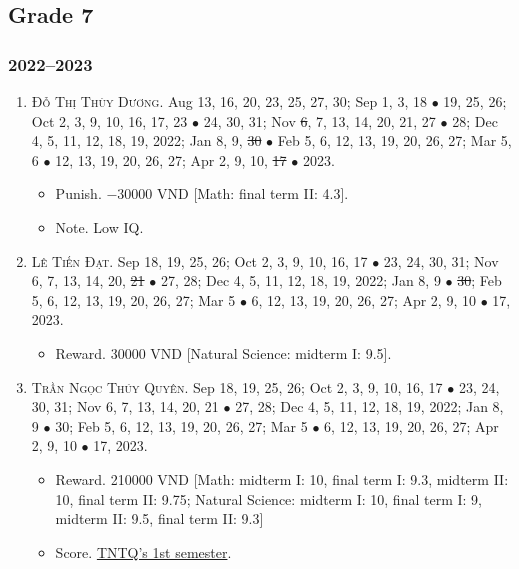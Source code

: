 \documentclass{article}
\begin{document}

\subsection{Grade 7}

\subsubsection{2022--2023}

\begin{enumerate}
	\item \textsc{Đỗ Thị Thùy Dương.} {\sf[In]} Aug 13, 16, 20, 23, 25, 27, 30; Sep 1, 3, 18 $\bullet$ 19, 25, 26; Oct 2, 3, 9, 10, 16, 17, 23 $\bullet$ 24, 30, 31; Nov \st{6}, 7, 13, 14, 20, 21, 27 $\bullet$ 28; Dec 4, 5, 11, 12, 18, 19, 2022; Jan 8, 9, \st{30} $\bullet$ Feb 5, 6, 12, 13, 19, 20, 26, 27; Mar 5, 6 $\bullet$ 12, 13, 19, 20, 26, 27; Apr 2, 9, 10, \st{17} $\bullet$ 2023. {\sf[Out]}
	\begin{itemize}
		\item {\sf Punish.} $-30000$ VND [Math: final term II: 4.3].
		\item {\sf Note.} Low IQ.
	\end{itemize}	
	\item \textsc{Lê Tiến Đạt.} {\sf[In]} Sep 18, 19, 25, 26; Oct 2, 3, 9, 10, 16, 17 $\bullet$ 23, 24, 30, 31; Nov 6, 7, 13, 14, 20, \st{21} $\bullet$ 27, 28; Dec 4, 5, 11, 12, 18, 19, 2022; Jan 8, 9 $\bullet$ \st{30}; Feb 5, 6, 12, 13, 19, 20, 26, 27; Mar 5 $\bullet$ 6, 12, 13, 19, 20, 26, 27; Apr 2, 9, 10 $\bullet$ 17, 2023.
	\begin{itemize}
		\item {\sf Reward.} 30000 VND [Natural Science: midterm I: 9.5].
	\end{itemize}
	\item \textsc{Trần Ngọc Thúy Quyên.} {\sf[In]} Sep 18, 19, 25, 26; Oct 2, 3, 9, 10, 16, 17 $\bullet$ 23, 24, 30, 31; Nov 6, 7, 13, 14, 20, 21 $\bullet$ 27, 28; Dec 4, 5, 11, 12, 18, 19, 2022; Jan 8, 9 $\bullet$ 30; Feb 5, 6, 12, 13, 19, 20, 26, 27; Mar 5 $\bullet$ 6, 12, 13, 19, 20, 26, 27; Apr 2, 9, 10 $\bullet$ 17, 2023.
	\begin{itemize}
		\item {\sf Reward.} 210000 VND [Math: midterm I: 10, final term I: 9.3, midterm II: 10, final term II: 9.75; Natural Science: midterm I: 10, final term I: 9, midterm II: 9.5, final term II: 9.3]
		\item {\sf Score.} \href{https://github.com/NQBH/hobby/blob/master/STEM/student/Tran_Ngoc_Thuy_Quyen_grade_7_1st_semester.jpg}{TNTQ's 1st semester}.

\end{itemize}
\end{enumerate}
\end{document}
